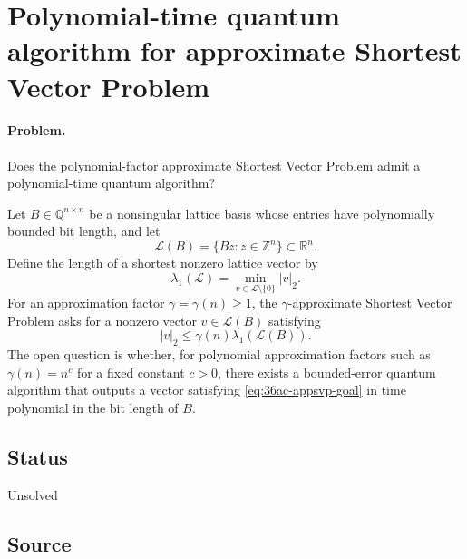 \section{Polynomial-time quantum algorithm for approximate Shortest Vector Problem}
\label{sec:op_36ac6718d2c37628}

\paragraph{Problem.}
Does the polynomial-factor approximate Shortest Vector Problem admit a
polynomial-time quantum algorithm?

Let $B\in\mathbb Q^{n\times n}$ be a nonsingular lattice basis whose entries
have polynomially bounded bit length, and let
\begin{equation}
  \mathcal L(B)=\{Bz:z\in\mathbb Z^n\}\subset\mathbb R^n .
  \label{eq:36ac-appsvp-lattice}
\end{equation}
Define the length of a shortest nonzero lattice vector by
\begin{equation}
  \lambda_1(\mathcal L)=\min_{v\in\mathcal L\setminus\{0\}}|v|_2 .
  \label{eq:36ac-appsvp-minimum}
\end{equation}
For an approximation factor $\gamma=\gamma(n)\geq 1$, the $\gamma$-approximate
Shortest Vector Problem asks for a nonzero vector $v\in\mathcal L(B)$
satisfying
\begin{equation}
  |v|_2\leq\gamma(n)\lambda_1(\mathcal L(B)).
  \label{eq:36ac-appsvp-goal}
\end{equation}
The open question is whether, for polynomial approximation factors such as
$\gamma(n)=n^c$ for a fixed constant $c>0$, there exists a bounded-error
quantum algorithm that outputs a vector satisfying
\eqref{eq:36ac-appsvp-goal} in time polynomial in the bit length of $B$.

\subsection*{Status}

Unsolved

\subsection*{Source}

